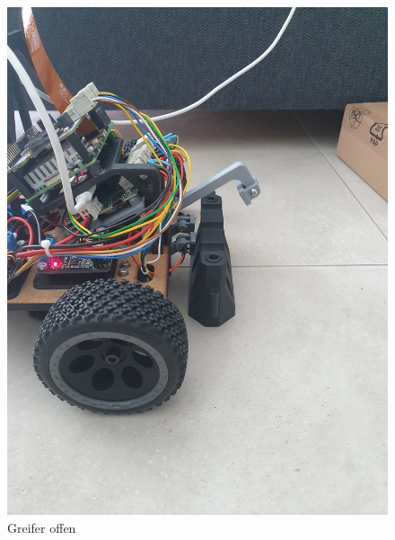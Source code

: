 \begin{figure}[H]
\centering
\begin{minipage}[b]{0.49\textwidth}
  \centering
    \includegraphics[width=\textwidth, angle=-90]{assets/MT/greifer-open.jpg}
    \caption{Greifer offen}
    \label{fig:greifer-open}
\end{minipage}
\hfill
\begin{minipage}[b]{0.49\textwidth}
  \centering

\end{minipage}
\end{figure}
